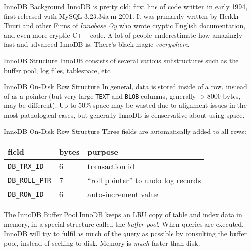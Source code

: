 \documentclass[14pt]{beamer}
\begin{document}
\begin{frame}{InnoDB Background}
  InnoDB is pretty old; first line of code written in early 1994, first released
  with MySQL-3.23.34a in 2001.
  \newline
  \newline
  It was primarily written by Heikki Tuuri and other Finns of \emph{Innobase Oy}
  who wrote cryptic English documentation, and even more cryptic C++ code.
  \newline
  \newline
  A lot of people underestimate how amazingly fast and advanced InnoDB
  is. There's black magic \emph{everywhere}.
\end{frame}

\begin{frame}{InnoDB Structure}
  InnoDB consists of several various substructures such as the buffer pool, log
  files, tablespace, etc.
\end{frame}

\begin{frame}{InnoDB On-Disk Row Structure}
  In general, data is stored inside of a row, instead of as a pointer (but very
  large \texttt{TEXT} and \texttt{BLOB} columns, generally $>8000$ bytes, may be
  different).
  \newline
  \newline
  Up to 50\% space may be wasted due to alignment issues in the most
  pathological cases, but generally InnoDB is conservative about using space.
\end{frame}

\begin{frame}{InnoDB On-Disk Row Structure}
  Three fields are automatically added to all rows:
  \begin{table}[ht]
    \begin{tabular}{l l l}
      field                  & bytes & purpose \\ \hline
      \texttt{DB\_TRX\_ID}   & 6     & transaction id \\
      \texttt{DB\_ROLL\_PTR} & 7     & ``roll pointer'' to undo log records \\
      \texttt{DB\_ROW\_ID}   & 6     & auto-increment value
    \end{tabular}
  \end{table}
\end{frame}

\begin{frame}{The InnoDB Buffer Pool}
  InnoDB keeps an LRU copy of table and index data in memory, in a special
  structure called the \emph{buffer pool}. When queries are executed, InnoDB
  will try to fulfil as much of the query as possible by consulting the buffer
  pool, instead of seeking to disk.
  \newline
  \newline
  Memory is \emph{much} faster than disk.
\end{frame}
\end{document}
